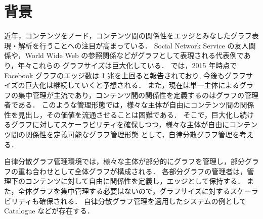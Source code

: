 \section{背景}
近年，コンテンツをノード，コンテンツ間の関係性をエッジとみなしたグラフ表現・解析を行うことへの注目が高まっている．
Social Network Service の友人関係や，World Wide Web の参照関係などがグラフとして表現される代表例であり，年々これらの
グラフサイズは巨大化している．
\cite{ching2015one}では，2015 年時点で Facebook グラフのエッジ数は 1 兆を上回ると報告されており, 
今後もグラフサイズの巨大化は継続していくと予想される．
また，現在は単一主体によるグラフの集中管理が主流であり，コンテンツ間の関係性を定義するのはグラフの管理者である．
このような管理形態では，様々な主体が自由にコンテンツ間の関係性を見出し，その価値を流通させることは困難である．
そこで，巨大化し続けるグラフに対してスケーラビリティを確保しつつ，様々な主体が自由にコンテンツ間の関係性を定義可能なグラフ管理形態
として，自律分散グラフ管理を考える．

自律分散グラフ管理環境では，様々な主体が部分的にグラフを管理し，部分グラフの重ね合わせとして全体グラフが構成される．
各部分グラフの管理者は，管理下のコンテンツに対して自由に関係性を定義し，エッジとして保持する．
また，全体グラフを集中管理する必要はないので，グラフサイズに対するスケーラビリティも確保される．
自律分散グラフ管理を適用したシステムの例として Catalogue \cite{catalogue}などが存在する．


